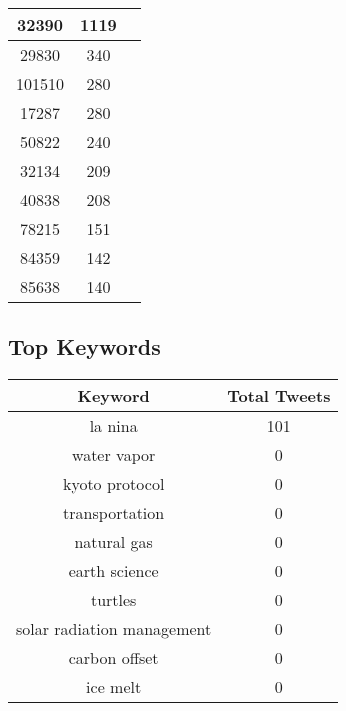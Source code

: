 \documentclass{article}\usepackage[T1]{fontenc}
\begin{document}
\begin{tabular}{|c|c|c|}
 \hline
32390 & 1119\\ 
 \hline
29830 & 340\\ 
 \hline
101510 & 280\\ 
 \hline
17287 & 280\\ 
 \hline
50822 & 240\\ 
 \hline
32134 & 209\\ 
 \hline
40838 & 208\\ 
 \hline
78215 & 151\\ 
 \hline
84359 & 142\\ 
 \hline
85638 & 140\\ 
 \hline
\end{tabular}\subsection*{Top Keywords}\begin{tabular}{|c|c|}         \hline         Keyword & Total Tweets \\ 
 \hline
la nina & 101\\ 
 \hline
water vapor & 0\\ 
 \hline
kyoto protocol & 0\\ 
 \hline
transportation & 0\\ 
 \hline
natural gas & 0\\ 
 \hline
earth science & 0\\ 
 \hline
turtles & 0\\ 
 \hline
solar radiation management & 0\\ 
 \hline
carbon offset & 0\\ 
 \hline
ice melt & 0\\ 
 \hline
\end{tabular}
\end{document}
